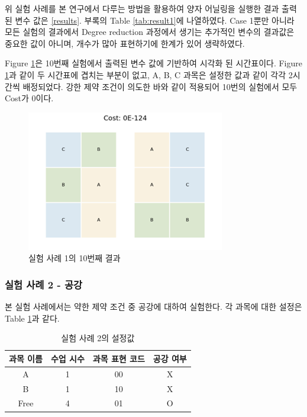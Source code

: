 \documentclass[12pt,a4paper]{article}
\begin{document}
    위 실험 사례를 본 연구에서 다루는 방법을 활용하여 양자 어닐링을 실행한 결과 출력된 변수 값은 \ref{results}. 부록의 Table \ref{tab:result1}에 나열하였다. Case 1뿐만 아니라 모든 실험의 결과에서 Degree reduction 과정에서 생기는 추가적인 변수의 결과값은 중요한 값이 아니며, 개수가 많아 표현하기에 한계가 있어 생략하였다.

    Figure \ref{fig:case1}은 10번째 실험에서 출력된 변수 값에 기반하여 시각화 된 시간표이다. Figure \ref{fig:case1}과 같이 두 시간표에 겹치는 부분이 없고, A, B, C 과목은 설정한 값과 같이 각각 2시간씩 배정되었다. 강한 제약 조건이 의도한 바와 같이 적용되어 10번의 실험에서 모두 Cost가 0이다.

    \begin{figure}[htb!]
        \centering
        \includegraphics[width=\textwidth]{Case1.png}
        \caption{실험 사례 1의 10번째 결과}
        \label{fig:case1}
    \end{figure}

    \subsubsection{실험 사례 2 - 공강}

    본 실험 사례에서는 약한 제약 조건 중 공강에 대하여 실험한다. 각 과목에 대한 설정은 Table \ref{tab:testcase2}과 같다.

    \begin{table}[htb!]
        \centering
        \begin{tabular}{c c c c}
             \hline
             과목 이름 & 수업 시수 & 과목 표현 코드 & 공강 여부\\
             \hline
             A & 1 & 00 & X\\
             B & 1 & 10 & X\\
             Free & 4 & 01 & O\\
             \hline
        \end{tabular}
        \caption{실험 사례 2의 설정값}\label{tab:testcase2}
    \end{table}
\end{document}
